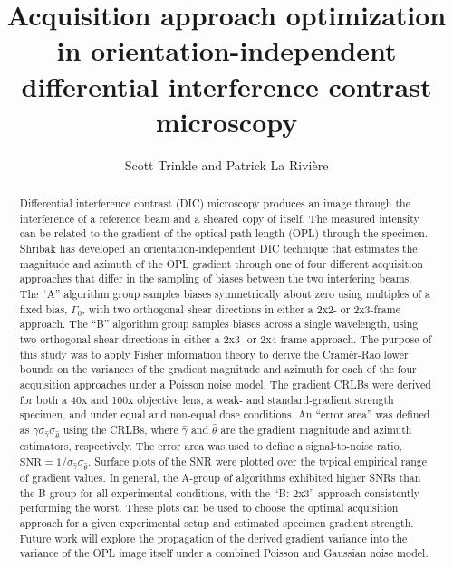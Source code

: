 \documentclass[aps, secnumarabic, amssymb, notitlepage]{article}
\begin{document}
\title{Acquisition approach optimization in orientation-independent differential interference contrast microscopy}
\author{Scott Trinkle and Patrick La Rivi\`ere}
\renewcommand\Affilfont{\fontsize{10}{10.8}\itshape}
\date{}

\maketitle

\begin{abstract}
  Differential interference contrast (DIC) microscopy produces an image through the interference of a reference beam and a sheared copy of itself. The measured intensity can be related to the gradient of the optical path length (OPL) through the specimen. Shribak \cite{shribak} has developed an orientation-independent DIC technique that estimates the magnitude and azimuth of the OPL gradient through one of four different acquisition approaches that differ in the sampling of biases between the two interfering beams. The ``A'' algorithm group samples biases symmetrically about zero using multiples of a fixed bias, $\Gamma_0$, with two orthogonal shear directions in either a 2x2- or 2x3-frame approach. The ``B'' algorithm group samples biases across a single wavelength, using two orthogonal shear directions in either a 2x3- or 2x4-frame approach. The purpose of this study was to apply Fisher information theory to derive the Cram\'er-Rao lower bounds on the variances of the gradient magnitude and azimuth for each of the four acquisition approaches under a Poisson noise model. The gradient CRLBs were derived for both a 40x and 100x objective lens, a weak- and standard-gradient strength specimen, and under equal and non-equal dose conditions. An ``error area'' was defined as $\gamma\sigma_{\hat{\gamma}}\sigma_{\hat{\theta}}$ using the CRLBs, where $\hat{\gamma}$ and $\hat{\theta}$ are the gradient magnitude and azimuth estimators, respectively. The error area was used to define a signal-to-noise ratio, $\text{SNR} = 1/\sigma_{\hat{\gamma}}\sigma_{\hat{\theta}}$. Surface plots of the SNR were plotted over the typical empirical range of gradient values. In general, the A-group of algorithms exhibited higher SNRs than the B-group for all experimental conditions, with the ``B: 2x3'' approach consistently performing the worst. These plots can be used to choose the optimal acquisition approach for a given experimental setup and estimated specimen gradient strength. Future work will explore the propagation of the derived gradient variance into the variance of the OPL image itself under a combined Poisson and Gaussian noise model. 
\end{abstract}
\end{document}

